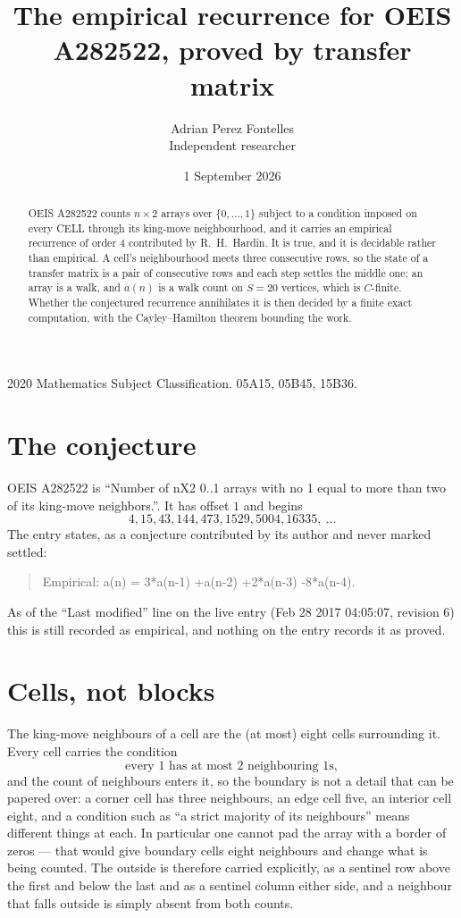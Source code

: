 \documentclass[11pt,a4paper]{article}
\title{The empirical recurrence for OEIS A282522, proved by transfer matrix}
\author{Adrian Perez Fontelles\\ \small Independent researcher}
\date{1 September 2026}
\theoremstyle{plain}
\theoremstyle{definition}
\begin{document}
\maketitle

\begin{abstract}
OEIS A282522 counts $n\times2$ arrays over $\{0,\dots,1\}$ subject to a condition imposed on
every CELL through its king-move neighbourhood, and it carries an empirical recurrence of
order $4$ contributed by R.~H.~Hardin. It is true, and it is decidable rather than
empirical. A cell's neighbourhood meets three consecutive rows, so the state of a transfer
matrix is a pair of consecutive rows and each step settles the middle one; an array is a
walk, and $a(n)$ is a walk count on $S=20$ vertices, which is $C$-finite. Whether the
conjectured recurrence annihilates it is then decided by a finite exact computation, with the
Cayley--Hamilton theorem bounding the work.
\end{abstract}

\noindent\small 2020 Mathematics Subject Classification. 05A15, 05B45, 15B36.\normalsize

\section{The conjecture}

OEIS A282522 is ``Number of nX2 0..1 arrays with no 1 equal to more than two of its king-move neighbors.''. It has offset $1$ and begins
\[
4, 15, 43, 144, 473, 1529, 5004, 16335,\ \dots
\]
The entry states, as a conjecture contributed by its author and never marked settled:
\begin{quote}
Empirical: a(n) = 3*a(n-1) +a(n-2) +2*a(n-3) -8*a(n-4).
\end{quote}
As of the ``Last modified'' line on the live entry (Feb 28 2017 04:05:07, revision 6) this is still
recorded as empirical, and nothing on the entry records it as proved.

\section{Cells, not blocks}

The king-move neighbours of a cell are the (at most) eight cells surrounding it. Every cell
carries the condition
\[
\text{every }1\text{ has at most }2\text{ neighbouring }1\text{s},
\]
and the count of neighbours enters it, so the boundary is not a detail that can be papered
over: a corner cell has three neighbours, an edge cell five, an interior cell eight, and a
condition such as ``a strict majority of its neighbours'' means different things at each. In
particular one cannot pad the array with a border of zeros --- that would give boundary cells
eight neighbours and change what is being counted. The outside is therefore carried
explicitly, as a sentinel row above the first and below the last and as a sentinel column
either side, and a neighbour that falls outside is simply absent from both counts.
\end{document}
